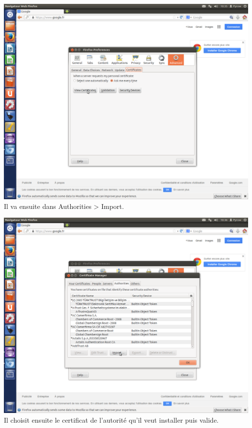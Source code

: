 \documentclass[a4paper,11pt,french]{book}
\begin{document}
\includegraphics[width=\textwidth]{images/OngletCert.png}
\newpage
Il va ensuite dans Authorities > Import.

\includegraphics[width=\textwidth]{images/OngletCA.png}
\newpage
Il choisit ensuite le certificat de l'autorité qu'il veut installer puis valide.
\end{document}
